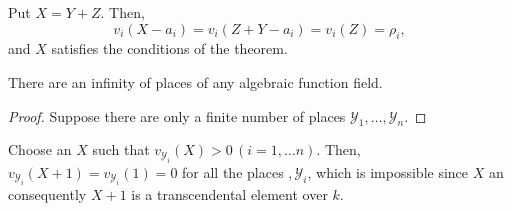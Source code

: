 Put $X = Y+Z$. Then,
$$
v_i (X-a_i) = v_i(Z+Y-a_i) = v_i (Z) = \rho_i,
$$
and $X$ satisfies the conditions of the theorem.

\begin{coro*}
  There are an infinity of places of any algebraic function field.
\end{coro*}

\begin{proof}
  Suppose there are only a finite number of places $\mathscr{Y}_1,
  \ldots, \mathscr{Y}_n$. 
\end{proof}

Choose an $X$ such that $v_{\mathscr{Y}_i} (X) > 0\, (i=1, \ldots
n)$. Then, $v_{\mathscr{Y}_i}(X+1) = v_{\mathscr{Y}_i}(1) = 0$ for
all the places $, \mathscr{Y}_i$, which is impossible since $X$ an
consequently $X+1$ is a transcendental element over $k$. 
